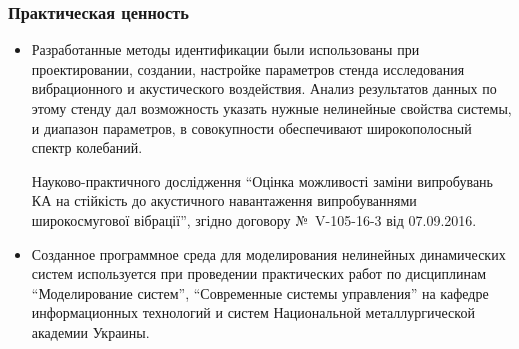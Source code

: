 \documentclass[10pt,utf8]{beamer}
\begin{document}

\begin{frame}
  \frametitle{Практическая ценность}

  \begin{itemize}

    \item
      Разработанные методы идентификации были использованы при проектировании,
      создании, настройке параметров стенда исследования вибрационного и
      акустического воздействия. Анализ результатов данных по этому стенду дал
      возможность указать нужные нелинейные свойства системы, и диапазон параметров,
      в совокупности обеспечивают широкополосный спектр колебаний.

      Науково-практичного дослідження
      ``Оцінка    можливості заміни випробувань КА на стійкість до акустичного навантаження
      випробуваннями широкосмугової вібрації'', згідно договору №~V-105-16-3 від 07.09.2016.

    \item
      Созданное программное среда для моделирования нелинейных динамических систем
      используется при проведении практических работ по дисциплинам
      ``Моделирование систем'', ``Современные системы управления''
      на кафедре информационных технологий
      и систем Национальной металлургической академии Украины.

  \end{itemize}


\end{frame}



\end{document}
